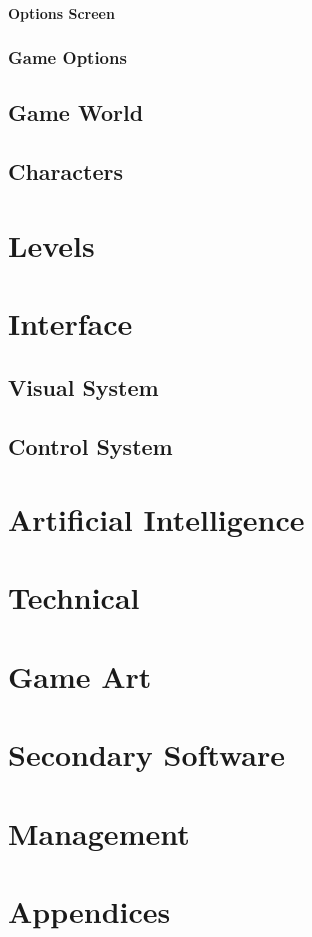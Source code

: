 \documentclass[14pt]{report}
\begin{document}
\subsubsection{Options Screen}
\subsection{Game Options}

\section{Game World}

\section{Characters}

\chapter{Levels}

\chapter{Interface}
\section{Visual System}
\section{Control System}

\chapter{Artificial Intelligence}

\chapter{Technical}

\chapter{Game Art}

\chapter{Secondary Software}

\chapter{Management}

\chapter{Appendices}
\end{document}
